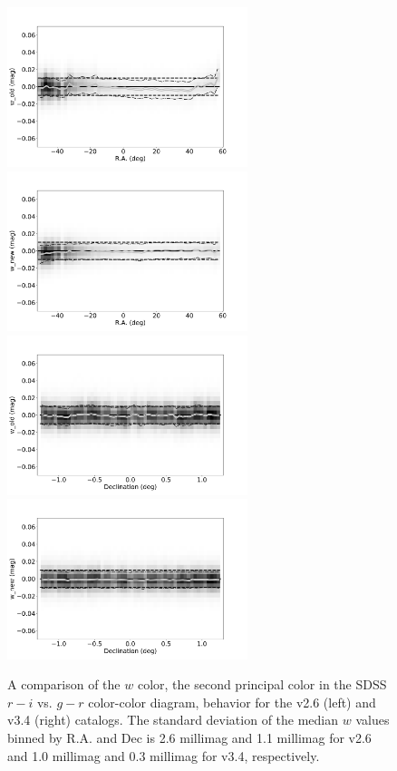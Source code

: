 \begin{figure}
    \centering\includegraphics[width=7cm]{figures/testV26vsV33_r_w_old_RA_Hess.png}
    \centering\includegraphics[width=7cm]{figures/testV26vsV33_r_w_new_RA_Hess.png}
    \centering\includegraphics[width=7cm]{figures/testV26vsV33_r_w_old_Dec_Hess.png}
    \centering\includegraphics[width=7cm]{figures/testV26vsV33_r_w_new_Dec_Hess.png}
\caption{A comparison of the $w$ color, the second principal color in the SDSS
$r-i$ vs. $g-r$ color-color diagram, behavior for the v2.6 (left) and v3.4 (right)
catalogs. The standard deviation of the median $w$ values binned by R.A. and Dec
is 2.6 millimag and 1.1 millimag for v2.6 and 1.0 millimag and 0.3 millimag for v3.4,
respectively.}
\label{fig:comparew} 
\end{figure}
 


